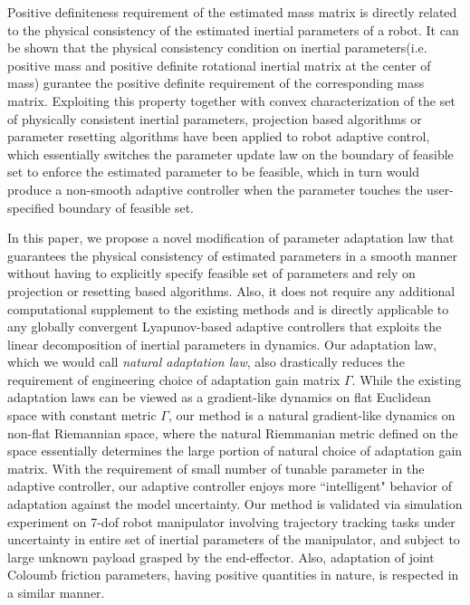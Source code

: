 \documentclass[letterpaper, 10 pt, conference]{ieeeconf}  %
\begin{document}
Positive definiteness requirement of the estimated mass matrix is directly related to the physical consistency of the estimated inertial parameters of a robot. It can be shown that the physical consistency condition on inertial parameters(i.e. positive mass and positive definite rotational inertial matrix at the center of mass) gurantee the positive definite requirement of the corresponding mass matrix. Exploiting this property together with convex characterization of the set of physically consistent inertial parameters, projection based algorithms or parameter resetting algorithms have been applied to robot adaptive control, which essentially switches the parameter update law on the boundary of feasible set to enforce the estimated parameter to be feasible, which in turn would produce a non-smooth adaptive controller when the parameter touches the user-specified boundary of feasible set.

In this paper, we propose a novel modification of parameter adaptation law that guarantees the physical consistency of estimated parameters in a smooth manner without having to explicitly specify feasible set of parameters and rely on projection or resetting based algorithms. Also, it does not require any additional computational supplement to the existing methods and is directly applicable to any globally convergent Lyapunov-based adaptive controllers that exploits the linear decomposition of inertial parameters in dynamics. Our adaptation law, which we would call {\em natural adaptation law}, also drastically reduces the requirement of engineering choice of adaptation gain matrix $\Gamma$. While the existing adaptation laws can be viewed as a gradient-like dynamics on flat Euclidean space with constant metric $\Gamma$, our method is a natural gradient-like dynamics on non-flat Riemannian space, where the natural Riemmanian metric defined on the space essentially determines the large portion of natural choice of adaptation gain matrix. With the requirement of small number of tunable parameter in the adaptive controller, our adaptive controller enjoys more ``intelligent" behavior of adaptation against the model uncertainty. Our method is validated via simulation experiment on 7-dof robot manipulator involving trajectory tracking tasks under uncertainty in entire set of inertial parameters of the manipulator, and subject to large unknown payload grasped by the end-effector. Also, adaptation of joint Coloumb friction parameters, having positive quantities in nature, is respected in a similar manner.
\end{document}
